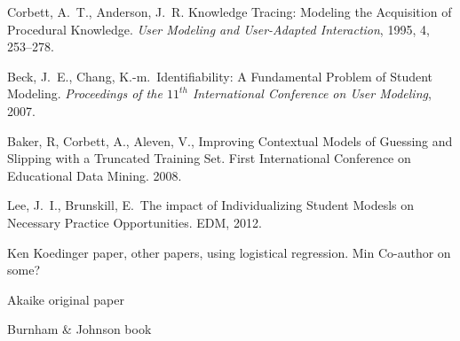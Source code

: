 \documentclass[11pt,letterpaper]{article}
\begin{document}
\begin{thebibliography}{9}

  Corbett, A.\ T., Anderson, J.\ R. Knowledge Tracing:  Modeling 
the Acquisition of Procedural Knowledge.  \emph{User Modeling and
 User-Adapted Interaction}, 1995, 4, 253--278.

  Beck, J.\ E., Chang, K.-m.\ Identifiability: A Fundamental Problem of
  Student Modeling.
  \emph{Proceedings of the $11^{th}$ International Conference on User 
    Modeling}, 2007.

 Baker, R, Corbett, A., Aleven, V.,  Improving Contextual 
    Models of Guessing and Slipping with a Truncated Training Set. 
    First International Conference on Educational Data Mining. 2008. 

   Lee, J.\ I., Brunskill, E.\ The impact of Individualizing Student 
  Modesls on Necessary Practice Opportunities.  EDM, 2012.

  Ken Koedinger paper, other papers, using logistical regression.
  Min Co-author on some?

   Akaike original paper

   Burnham \& Johnson book

\end{thebibliography}
\end{document}
